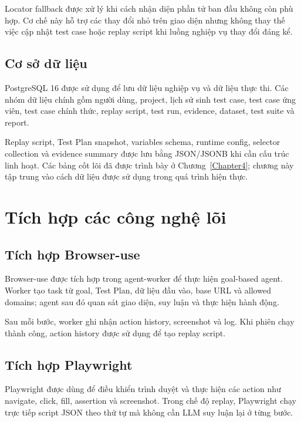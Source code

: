 Locator fallback được xử lý khi cách nhận diện phần tử ban đầu không còn phù hợp. Cơ chế này hỗ trợ các thay đổi nhỏ trên giao diện nhưng không thay thế việc cập nhật test case hoặc replay script khi luồng nghiệp vụ thay đổi đáng kể.

\subsection{Cơ sở dữ liệu}

PostgreSQL 16 được sử dụng để lưu dữ liệu nghiệp vụ và dữ liệu thực thi. Các nhóm dữ liệu chính gồm người dùng, project, lịch sử sinh test case, test case ứng viên, test case chính thức, replay script, test run, evidence, dataset, test suite và report.

Replay script, Test Plan snapshot, variables schema, runtime config, selector collection và evidence summary được lưu bằng JSON/JSONB khi cần cấu trúc linh hoạt. Các bảng cốt lõi đã được trình bày ở Chương~\ref{Chapter4}; chương này tập trung vào cách dữ liệu được sử dụng trong quá trình hiện thực.

\section{Tích hợp các công nghệ lõi}

\subsection{Tích hợp Browser-use}

Browser-use được tích hợp trong agent-worker để thực hiện goal-based agent. Worker tạo task từ goal, Test Plan, dữ liệu đầu vào, base URL và allowed domains; agent sau đó quan sát giao diện, suy luận và thực hiện hành động.

Sau mỗi bước, worker ghi nhận action history, screenshot và log. Khi phiên chạy thành công, action history được sử dụng để tạo replay script.

\subsection{Tích hợp Playwright}

Playwright được dùng để điều khiển trình duyệt và thực hiện các action như navigate, click, fill, assertion và screenshot. Trong chế độ replay, Playwright chạy trực tiếp script JSON theo thứ tự mà không cần LLM suy luận lại ở từng bước.

